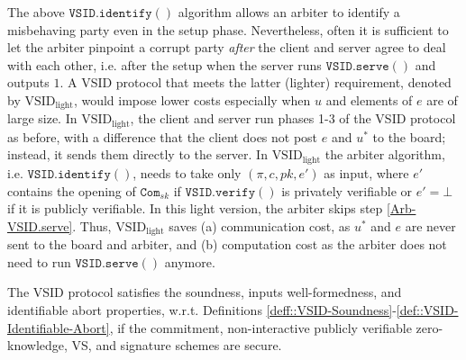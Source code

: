 \begin{remark}\label{remark::light-VSID}
The above  $\mathtt{VSID.identify}()$ algorithm   allows an arbiter  to identify a misbehaving party even in the setup phase. Nevertheless, often it is sufficient  to let the arbiter pinpoint a corrupt party \emph{after} the client and server agree to deal with each other, i.e. after the setup when the server runs  $\mathtt{VSID.serve}()$ and outputs $1$. A VSID protocol that meets the latter (lighter) requirement, denoted by $\text{VSID}_{\scriptscriptstyle \text{light}}$, would impose lower costs  especially when $u$ and elements of $e$ are of large size. In  $\text{VSID}_{\scriptscriptstyle \text{light}}$, the client and server  run phases 1-3 of the VSID protocol as before, with a difference that the client does not post $e$ and $u^{\scriptscriptstyle*}$ to the board; instead, it sends them directly to the server. In $\text{VSID}_{\scriptscriptstyle\text{light}}$  the arbiter algorithm, i.e. $\mathtt{VSID.identify}()$, needs to take only $(\pi, c, pk, e')$ as input, where $e'$ contains the opening of $\mathtt{Com}_{\scriptscriptstyle {sk}}$ if $\mathtt{VSID.verify}()$ is privately verifiable or $e'=\bot$ if  it is publicly verifiable. In this light version, the arbiter   skips step \ref{Arb-VSID.serve}. Thus, $\text{VSID}_{\scriptscriptstyle\text{light}}$ saves (a)  communication cost, as   $u^{\scriptscriptstyle*}$ and $e$ are never sent to the board and  arbiter, and (b) computation  cost as the arbiter does not need to run $\mathtt{VSID.serve}()$ anymore.
\end{remark}


\begin{theorem}
The VSID protocol satisfies the soundness, inputs well-formedness, and identifiable abort properties, w.r.t. Definitions \ref{deff::VSID-Soundness}-\ref{def::VSID-Identifiable-Abort}, if the commitment, non-interactive publicly verifiable zero-knowledge, VS, and signature schemes are secure. 
\end{theorem}













